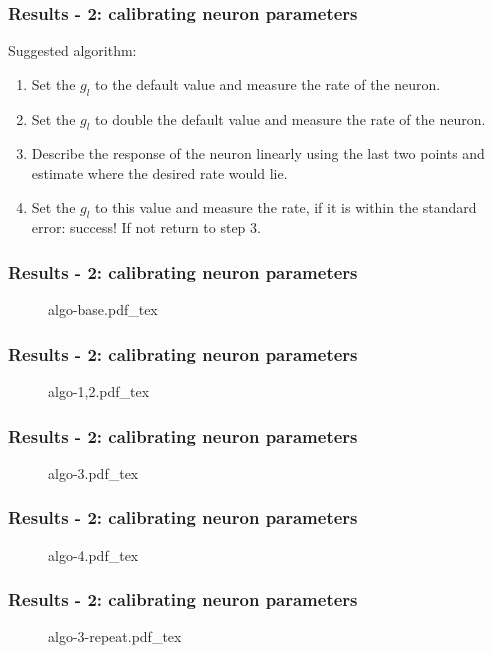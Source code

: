 \documentclass{beamer}
\newcommand{\incfig}[1]{
    \def\svgwidth{\columnwidth}
    {#1.pdf_tex}
}
\begin{document}
\begin{frame}
    \frametitle{Results - 2: calibrating neuron parameters}
    Suggested algorithm:
    \begin{enumerate}
        \item Set the $g_l$ to the default value and measure the rate of the neuron.
        \item Set the $g_l$ to double the default value and measure the rate of the
            neuron.
        \item Describe the response of the neuron linearly using the last two
            points and estimate where the desired rate would lie.
        \item Set the $g_l$ to this value and measure the rate, if it is within the
        standard error: success! If not return to step 3.
    \end{enumerate}
\end{frame}

\begin{frame}
    \frametitle{Results - 2: calibrating neuron parameters}
    \begin{figure}
        \incfig{algo-base}
    \end{figure}
\end{frame}

\begin{frame}
    \frametitle{Results - 2: calibrating neuron parameters}
    \begin{figure}
        \incfig{algo-1,2}
    \end{figure}
\end{frame}

\begin{frame}
    \frametitle{Results - 2: calibrating neuron parameters}
    \begin{figure}
        \incfig{algo-3}
    \end{figure}
\end{frame}

\begin{frame}
    \frametitle{Results - 2: calibrating neuron parameters}
    \begin{figure}
        \incfig{algo-4}
    \end{figure}
\end{frame}

\begin{frame}
    \frametitle{Results - 2: calibrating neuron parameters}
    \begin{figure}
        \incfig{algo-3-repeat}
    \end{figure}
\end{frame}
\end{document}
